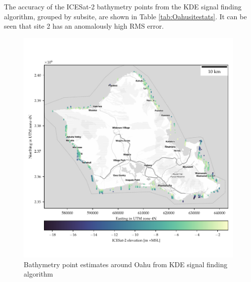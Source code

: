 The accuracy of the ICESat-2 bathymetry points from the KDE signal finding algorithm, grouped by subsite, are shown in Table \ref{tab:Oahusitestats}. It can be seen that site 2 has an anomalously high RMS error.

\begin{figure}[htbp]
    \centering
    \includegraphics{figures/Oahu_all_sites_photon_points.pdf}
    \caption{Bathymetry point estimates around Oahu from KDE signal finding algorithm}
    \label{fig:oahu-photon-map}
\end{figure}


\begin{figure}
    \begin{floatrow}
    \end{floatrow}
\end{figure}

